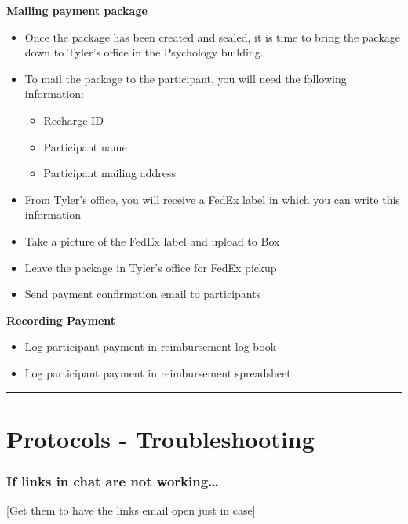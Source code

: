 \documentclass[]{book}
\begin{document}
\textbf{Mailing payment package}

\begin{itemize}
\item
  Once the package has been created and sealed, it is time to bring the package down to Tyler's office in the Psychology building.
\item
  To mail the package to the participant, you will need the following information:

  \begin{itemize}
  \item
    Recharge ID
  \item
    Participant name
  \item
    Participant mailing address
  \end{itemize}
\item
  From Tyler's office, you will receive a FedEx label in which you can write this information
\item
  Take a picture of the FedEx label and upload to Box
\item
  Leave the package in Tyler's office for FedEx pickup
\item
  Send payment confirmation email to participants
\end{itemize}

\textbf{Recording Payment}

\begin{itemize}
\item
  Log participant payment in reimbursement log book
\item
  Log participant payment in reimbursement spreadsheet
\end{itemize}

\begin{center}\rule{0.5\linewidth}{0.5pt}\end{center}

\hypertarget{protocols---troubleshooting}{%
\section{Protocols - Troubleshooting}\label{protocols---troubleshooting}}

\hypertarget{if-links-in-chat-are-not-working}{%
\subsubsection{If links in chat are not working\ldots{}}\label{if-links-in-chat-are-not-working}}

{[}Get them to have the links email open just in case{]}
\end{document}
